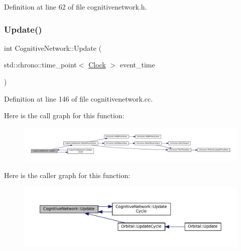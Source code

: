 Definition at line 62 of file cognitivenetwork.\+h.

\mbox{\label{class_cognitive_network_a05dccc7759456df13a732899a8f1f4c4}} 
\subsubsection{\texorpdfstring{Update()}{Update()}}
{\footnotesize\ttfamily int Cognitive\+Network\+::\+Update (\begin{DoxyParamCaption}\item[{std\+::chrono\+::time\+\_\+point$<$ \mbox{\hyperlink{universe_8h_a0ef8d951d1ca5ab3cfaf7ab4c7a6fd80}{Clock}} $>$}]{event\+\_\+time }\end{DoxyParamCaption})}



Definition at line 146 of file cognitivenetwork.\+cc.

Here is the call graph for this function\+:\nopagebreak
\begin{figure}[H]
\begin{center}
\leavevmode
\includegraphics[width=350pt]{class_cognitive_network_a05dccc7759456df13a732899a8f1f4c4_cgraph}
\end{center}
\end{figure}
Here is the caller graph for this function\+:\nopagebreak
\begin{figure}[H]
\begin{center}
\leavevmode
\includegraphics[width=350pt]{class_cognitive_network_a05dccc7759456df13a732899a8f1f4c4_icgraph}
\end{center}
\end{figure}
\mbox{\label{class_cognitive_network_aa37dda869174e4eef986cca4ce3e55d2}} 
